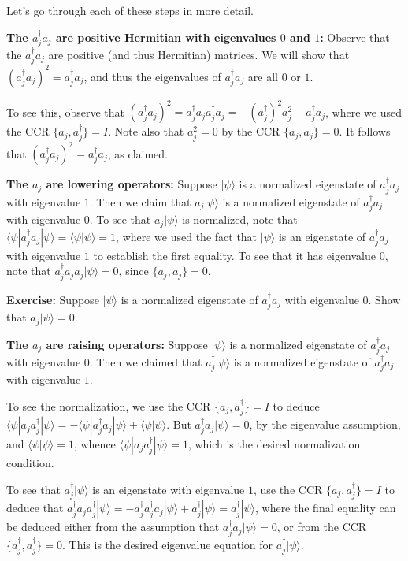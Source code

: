 \documentclass[12pt]{article}
\begin{document}
Let's go through each of these steps in more detail.

\textbf{The $a_j^\dagger a_j$ are positive Hermitian with eigenvalues
  $0$ and $1$:} Observe that the $a_j^\dagger a_j$ are positive (and
thus Hermitian) matrices.  We will show that $(a_j^\dagger a_j)^2 =
a_j^\dagger a_j$, and thus the eigenvalues of $a_j^\dagger a_j$ are
all $0$ or $1$.

To see this, observe that $(a_j^\dagger a_j)^2 = a_j^\dagger a_j
a_j^\dagger a_j = -(a_j^\dagger)^2 a_j^2 + a_j^\dagger a_j$, where we
used the CCR $\{a_j,a_j^\dagger \} = I$.  Note also that $a_j^2 = 0$
by the CCR $\{a_j,a_j\} = 0$.  It follows that $(a_j^\dagger a_j)^2 =
a_j^\dagger a_j$, as claimed.

\textbf{The $a_j$ are lowering operators:} Suppose $|\psi\rangle$ is a
normalized eigenstate of $a_j^\dagger a_j$ with eigenvalue $1$.  Then
we claim that $a_j|\psi\rangle$ is a normalized eigenstate of
$a_j^\dagger a_j$ with eigenvalue $0$.  To see that $a_j|\psi\rangle$
is normalized, note that $\langle \psi|a_j^\dagger a_j |\psi\rangle =
\langle \psi|\psi\rangle = 1$, where we used the fact that
$|\psi\rangle$ is an eigenstate of $a_j^\dagger a_j$ with eigenvalue
$1$ to establish the first equality.  To see that it has eigenvalue
$0$, note that $a_j^\dagger a_j a_j|\psi\rangle = 0$, since $\{
a_j,a_j \} = 0$.

\textbf{Exercise:} Suppose $|\psi\rangle$ is a normalized eigenstate
of $a_j^\dagger a_j$ with eigenvalue $0$.  Show that $a_j |\psi\rangle
= 0$.

\textbf{The $a_j$ are raising operators:} Suppose $|\psi\rangle$ is a
normalized eigenstate of $a_j^\dagger a_j$ with eigenvalue $0$.  Then
we claimed that $a_j^\dagger|\psi\rangle$ is a normalized eigenstate
of $a_j^\dagger a_j$ with eigenvalue $1$.

To see the normalization, we use the CCR $\{ a_j,a_j^\dagger \} = I$
to deduce $\langle \psi|a_j a_j^\dagger |\psi\rangle = -\langle
\psi|a_j^\dagger a_j|\psi\rangle + \langle \psi|\psi\rangle$.  But
$a_j^\dagger a_j|\psi\rangle = 0$, by the eigenvalue assumption, and
$\langle \psi|\psi\rangle = 1$, whence $\langle \psi|a_j a_j^\dagger
|\psi\rangle = 1$, which is the desired normalization condition.

To see that $a_j^\dagger |\psi\rangle$ is an eigenstate with
eigenvalue $1$, use the CCR $\{a_j,a_j^\dagger \} = I$ to deduce that
$a_j^\dagger a_j a_j^\dagger |\psi\rangle = - a_j^\dagger a_j^\dagger
a_j|\psi\rangle + a_j^\dagger|\psi\rangle = a_j^\dagger |\psi\rangle$,
where the final equality can be deduced either from the assumption
that $a_j^\dagger a_j |\psi\rangle = 0$, or from the CCR $\{
a_j^\dagger,a_j^\dagger \} = 0$.  This is the desired eigenvalue
equation for $a_j^\dagger|\psi\rangle$.
\end{document}
